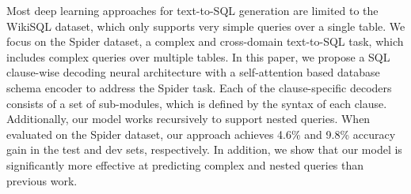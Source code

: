 Most deep learning approaches for text-to-SQL generation are limited to the WikiSQL dataset, which only supports very simple queries over a single table. We focus on the Spider dataset, a complex and cross-domain text-to-SQL task, which includes complex queries over multiple tables. In this paper, we propose a SQL clause-wise decoding neural architecture with a self-attention based database schema encoder to address the Spider task. Each of the clause-specific decoders consists of a set of sub-modules, which is defined by the syntax of each clause. Additionally, our model works recursively to support nested queries. When evaluated on the Spider dataset, our approach achieves 4.6\% and 9.8\% accuracy gain in the test and dev sets, respectively. In addition, we show that our model is significantly more effective at predicting complex and nested queries than previous work.